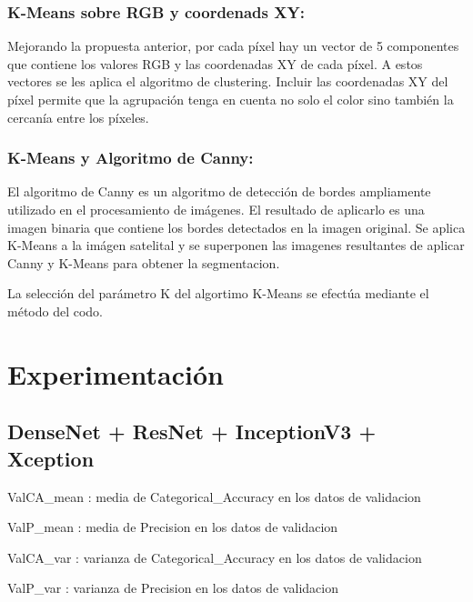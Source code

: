 \documentclass[article]{llncs}
\begin{document}
\subsubsection{K-Means sobre RGB y coordenads XY:}
Mejorando la propuesta anterior, por cada p\'ixel hay un vector de 5 componentes 
que contiene los valores RGB y las coordenadas XY de cada p\'ixel. A estos vectores se les aplica el algoritmo de clustering. Incluir 
las coordenadas XY del p\'ixel permite que la agrupaci\'on tenga en cuenta no solo el color sino también la cercan\'ia 
entre los p\'ixeles. 

\subsubsection{K-Means y Algoritmo de Canny:}
El algoritmo de Canny es un algoritmo de detección de bordes ampliamente utilizado en el procesamiento de imágenes. 
El resultado de aplicarlo es una imagen binaria que contiene los bordes detectados en la imagen original. Se aplica 
K-Means a la im\'agen satelital y se superponen las imagenes resultantes de aplicar Canny y K-Means para obtener la segmentacion.

La selecci\'on del par\'ametro K del algortimo K-Means se efect\'ua mediante el m\'etodo del codo. 

\section{Experimentaci\'on}

\subsection{DenseNet + ResNet + InceptionV3 + Xception}

ValCA\_mean : media de Categorical\_Accuracy en los datos de validacion

ValP\_mean : media de Precision en los datos de validacion

ValCA\_var : varianza de Categorical\_Accuracy en los datos de validacion

ValP\_var : varianza de Precision en los datos de validacion
\end{document}

